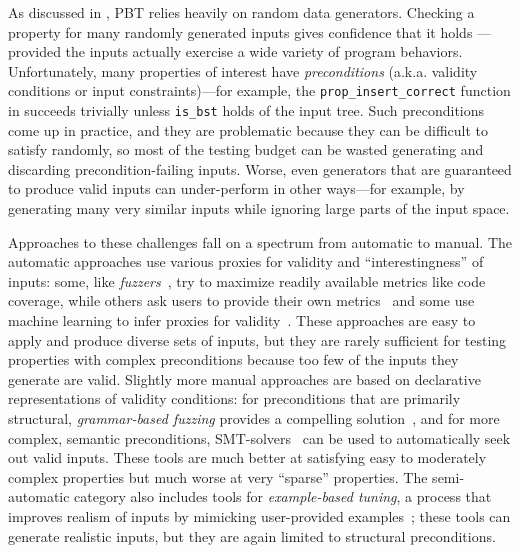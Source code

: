 As discussed in , PBT relies heavily on {random data
generators}.  Checking a property for many randomly generated inputs
gives confidence that it holds ---provided the inputs actually
exercise a wide variety of program behaviors.
Unfortunately,
many properties of interest have {\em preconditions}
({a.k.a.} {validity conditions} or {input constraints})---for example,
the \verb|prop_insert_correct| function in  succeeds trivially unless
\verb|is_bst| holds of the input tree.  Such preconditions come up in
practice, and they are problematic because they can be
difficult to satisfy randomly, so most of the testing budget
can be wasted generating and discarding precondition-failing inputs.
%
%
Worse, even generators that are guaranteed to produce valid
inputs can under-perform in other ways---for example, by
generating many very similar inputs while ignoring large parts of
the input space.

Approaches to these challenges
fall on a spectrum from automatic to manual. The automatic approaches use
various proxies for validity and ``interestingness'' of
inputs: some, like {\em
fuzzers}~\cite{afl-readme}, try to maximize readily available metrics like code
coverage, while others ask users to provide their own metrics~\cite{loscher2017targetedpbt} and
some use machine learning to infer proxies for
validity~\cite{godefroid2017learn, DBLP:conf/icse/ReddyLPS20}. These approaches
are easy to apply and produce diverse sets of inputs, but they are rarely
sufficient for testing properties with complex
preconditions because too few of the inputs they generate are
valid. Slightly more
manual approaches are based on declarative representations of validity
conditions: for preconditions that are primarily structural, {\em grammar-based
fuzzing} provides a compelling solution~\cite{godefroid2008grammar,
holler2012fuzzing, veggalam2016ifuzzer, wang2019superion,
srivastava2021gramatron}, and for more complex, semantic preconditions,
SMT-solvers~\cite{dewey2017automated, beginners-luck,
steinhofel_input_2022} can be used to automatically seek out valid
inputs. These tools are
much better at satisfying easy to moderately complex properties but
much worse at very ``sparse'' properties. The semi-automatic
category also includes tools for {\em example-based tuning}, a process that
improves realism of inputs by mimicking user-provided
examples~\cite{soremekun2020inputs}; these tools can generate
realistic inputs, but they are again limited to structural preconditions.

